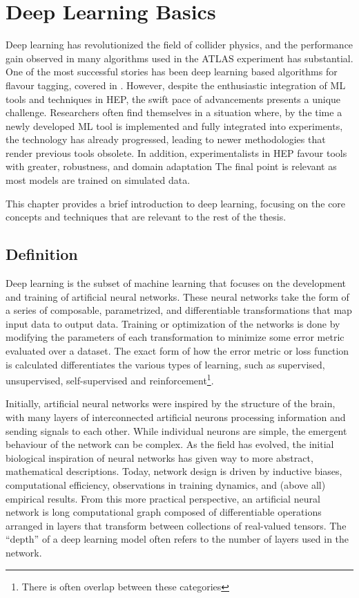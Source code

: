 \chapter{Deep Learning Basics}
\label{chap:deep_learning}

Deep learning has revolutionized the field of collider physics, and the performance gain observed in many algorithms used in the ATLAS experiment has substantial.
One of the most successful stories has been deep learning based algorithms for flavour tagging, covered in .
However, despite the enthusiastic integration of ML tools and techniques in HEP, the swift pace of advancements presents a unique challenge.
Researchers often find themselves in a situation where, by the time a newly developed ML tool is implemented and fully integrated into experiments, the technology has already progressed, leading to newer methodologies that render previous tools obsolete.
In addition, experimentalists in HEP favour tools with greater, robustness, and domain adaptation
The final point is relevant as most models are trained on simulated data.

This chapter provides a brief introduction to deep learning, focusing on the core concepts and techniques that are relevant to the rest of the thesis.

\section{Definition}

Deep learning is the subset of machine learning that focuses on the development and training of artificial neural networks.
These neural networks take the form of a series of composable, parametrized, and differentiable transformations that map input data to output data.
Training or optimization of the networks is done by modifying the parameters of each transformation to minimize some error metric evaluated over a dataset.
The exact form of how the error metric or loss function is calculated differentiates the various types of learning, such as supervised, unsupervised, self-supervised and reinforcement\footnote{There is often overlap between these categories}.

Initially, artificial neural networks were inspired by the structure of the brain, with many layers of interconnected artificial neurons processing information and sending signals to each other.
While individual neurons are simple, the emergent behaviour of the network can be complex.
As the field has evolved, the initial biological inspiration of neural networks has given way to more abstract, mathematical descriptions.
Today, network design is driven by inductive biases, computational efficiency, observations in training dynamics, and (above all) empirical results.
From this more practical perspective, an artificial neural network is long computational graph composed of differentiable operations arranged in layers that transform between collections of real-valued tensors.
The ``depth'' of a deep learning model often refers to the number of layers used in the network.

